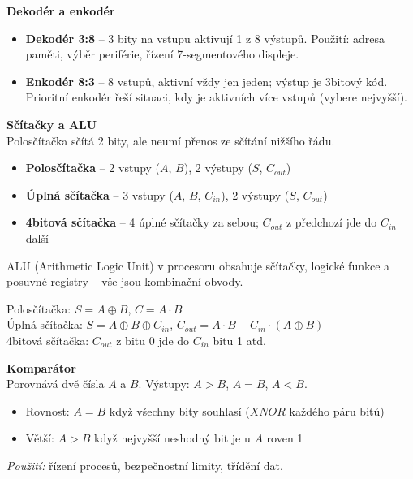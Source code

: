 \documentclass[a4paper,10pt]{article}
\begin{document}
\begin{vysvetlenibox}
\textbf{Dekodér a enkodér}\\
\begin{itemize}[noitemsep, leftmargin=1.4em, topsep=4pt]
    \item \textbf{Dekodér 3:8} -- 3 bity na vstupu aktivují 1 z 8 výstupů.
          Použití: adresa paměti, výběr periférie, řízení 7-segmentového displeje.
    \item \textbf{Enkodér 8:3} -- 8 vstupů, aktivní vždy jen jeden; výstup je 3bitový kód.
          Prioritní enkodér řeší situaci, kdy je aktivních více vstupů (vybere nejvyšší).
\end{itemize}

\textbf{Sčítačky a ALU}\\
Polosčítačka sčítá 2 bity, ale neumí přenos ze sčítání nižšího řádu.
\begin{itemize}[noitemsep, leftmargin=1.4em, topsep=4pt]
    \item \textbf{Polosčítačka} -- 2 vstupy ($A$, $B$), 2 výstupy ($S$, $C_{out}$)
    \item \textbf{Úplná sčítačka} -- 3 vstupy ($A$, $B$, $C_{in}$), 2 výstupy ($S$, $C_{out}$)
    \item \textbf{4bitová sčítačka} -- 4 úplné sčítačky za sebou; $C_{out}$ z předchozí jde do $C_{in}$ další
\end{itemize}
ALU (Arithmetic Logic Unit) v procesoru obsahuje sčítačky, logické funkce
a posuvné registry -- vše jsou kombinační obvody.

\begin{vzorcebox}
Polosčítačka: $S = A \oplus B$, \quad $C = A \cdot B$\\
Úplná sčítačka: $S = A \oplus B \oplus C_{in}$, \quad
$C_{out} = A \cdot B + C_{in} \cdot (A \oplus B)$\\
4bitová sčítačka: $C_{out}$ z bitu 0 jde do $C_{in}$ bitu 1 atd.
\end{vzorcebox}

\textbf{Komparátor}\\
Porovnává dvě čísla $A$ a $B$. Výstupy: $A>B$, $A=B$, $A<B$.
\begin{itemize}[noitemsep, leftmargin=1.4em, topsep=4pt]
    \item Rovnost: $A=B$ když všechny bity souhlasí ($XNOR$ každého páru bitů)
    \item Větší: $A>B$ když nejvyšší neshodný bit je u $A$ roven 1
\end{itemize}
\textit{Použití:} řízení procesů, bezpečnostní limity, třídění dat.
\end{vysvetlenibox}


\end{document}
